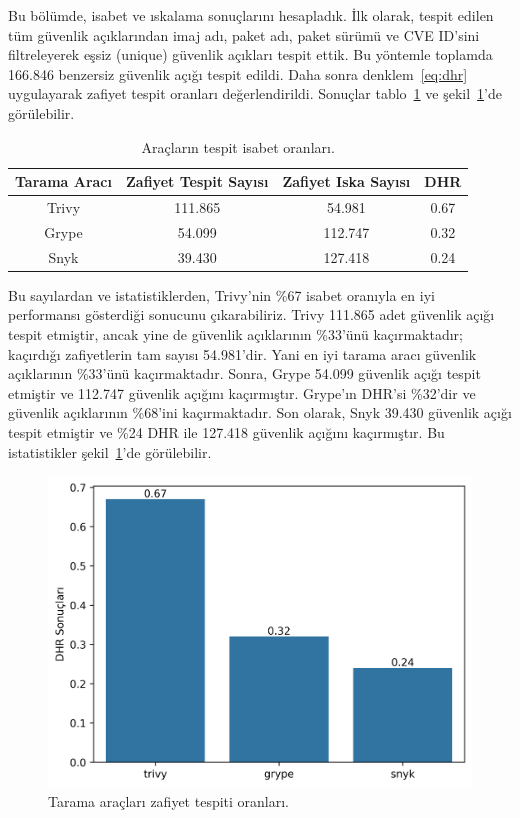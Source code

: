 Bu bölümde, isabet ve ıskalama sonuçlarını hesapladık. İlk olarak, tespit edilen tüm güvenlik açıklarından imaj adı, paket adı, paket sürümü ve CVE ID'sini filtreleyerek eşsiz (unique) güvenlik açıkları tespit ettik. Bu yöntemle toplamda 166.846 benzersiz güvenlik açığı tespit edildi. Daha sonra denklem~\ref{eq:dhr} uygulayarak zafiyet tespit oranları değerlendirildi. Sonuçlar tablo~\ref{tab:hit-and-miss} ve şekil~\ref{fig:hit-and-miss}'de görülebilir.

\begin{table}
    \caption{Araçların tespit isabet oranları.}\label{tab:hit-and-miss}
    \centering
    \begin{tabular}{ |c|c|c|c| }
        \hline
        Tarama Aracı & Zafiyet Tespit Sayısı & Zafiyet Iska Sayısı & DHR \\
        \hline
        Trivy & 111.865 &  54.981 & 0.67 \\
        Grype &  54.099 & 112.747 & 0.32 \\
        Snyk  &  39.430 & 127.418 & 0.24 \\
        \hline
    \end{tabular}
\end{table}

Bu sayılardan ve istatistiklerden, Trivy'nin \%67 isabet oranıyla en iyi performansı gösterdiği sonucunu çıkarabiliriz. Trivy 111.865 adet güvenlik açığı tespit etmiştir, ancak yine de güvenlik açıklarının \%33'ünü kaçırmaktadır; kaçırdığı zafiyetlerin tam sayısı 54.981'dir. Yani en iyi tarama aracı güvenlik açıklarının \%33'ünü kaçırmaktadır. Sonra, Grype 54.099 güvenlik açığı tespit etmiştir ve 112.747 güvenlik açığını kaçırmıştır. Grype'ın DHR'si \%32'dir ve güvenlik açıklarının \%68'ini kaçırmaktadır. Son olarak, Snyk 39.430 güvenlik açığı tespit etmiştir ve \%24 DHR ile 127.418 güvenlik açığını kaçırmıştır. Bu istatistikler şekil~\ref{fig:hit-and-miss}'de görülebilir.

\begin{figure}
    \centering
    \includegraphics[width=1\linewidth]{images/s1/DHR.png}
    \caption{Tarama araçları zafiyet tespiti oranları.}\label{fig:hit-and-miss}
\end{figure}

